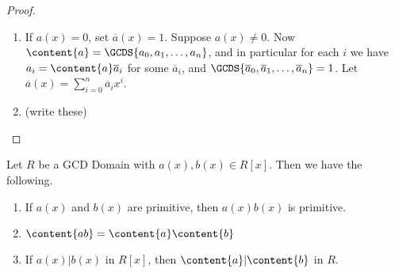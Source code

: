 \documentclass{article}
\begin{document}
\begin{proof} \mbox{}
\begin{enumerate}
\item If $a(x) = 0$, set $\overline{a}(x) = 1$. Suppose $a(x) \neq 0$. Now $\content{a} = \GCDS{a_0,a_1,\ldots,a_n}$, and in particular for each $i$ we have $a_i = \content{a}\overline{a}_i$ for some $\overline{a}_i$, and $\GCDS{\overline{a}_0, \overline{a}_1, \ldots, \overline{a}_n} = 1$. Let $\overline{a}(x) = \sum_{i=0}^n \overline{a}_i x^i$.

\item (write these)
\end{enumerate}
\end{proof}

\begin{prop}
Let $R$ be a GCD Domain with $a(x), b(x) \in R[x]$. Then we have the following.
\begin{enumerate}
\item If $a(x)$ and $b(x)$ are primitive, then $a(x)b(x)$ is primitive.
\item $\content{ab} = \content{a}\content{b}$
\item If $a(x)|b(x)$ in $R[x]$, then $\content{a}|\content{b}$ in $R$.
\end{enumerate}
\end{prop}
\end{document}
